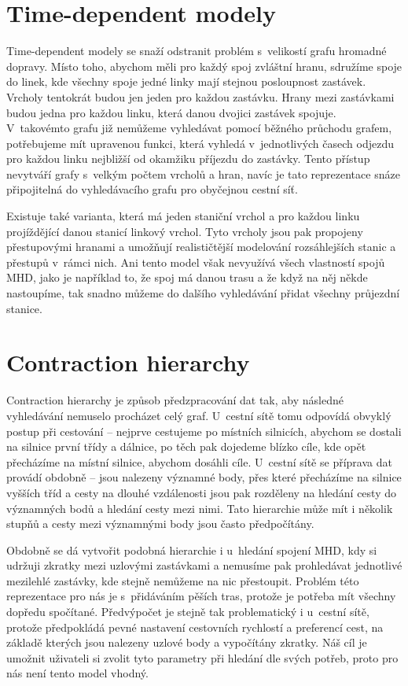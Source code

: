 \section{Time-dependent modely}
Time-dependent modely\cite{time-dependent} se snaží odstranit problém
s~velikostí grafu hromadné dopravy. Místo toho, abychom měli pro každý spoj
zvláštní hranu, sdružíme spoje do linek, kde všechny spoje jedné linky mají
stejnou posloupnost zastávek. Vrcholy tentokrát budou jen jeden pro každou
zastávku. Hrany mezi zastávkami budou jedna pro každou linku, která danou
dvojici zastávek spojuje. V~takovémto grafu již nemůžeme vyhledávat pomocí
běžného průchodu grafem, potřebujeme mít upravenou funkci, která vyhledá
v~jednotlivých časech odjezdu pro každou linku nejbližší od okamžiku příjezdu do
zastávky. Tento přístup nevytváří grafy s~velkým počtem vrcholů a hran, navíc je
tato reprezentace snáze připojitelná do vyhledávacího grafu pro obyčejnou cestní
síť.

Existuje také varianta, která má jeden staniční vrchol a
pro každou linku projíždějící danou stanicí linkový vrchol. Tyto vrcholy jsou
pak propojeny přestupovými hranami a umožňují realističtější modelování
rozsáhlejších stanic a přestupů v~rámci nich. Ani tento model však nevyužívá
všech vlastností spojů MHD, jako je například to, že spoj má danou trasu a že
když na něj někde nastoupíme, tak snadno můžeme do dalšího vyhledávání přidat všechny
průjezdní stanice.  

\section{Contraction hierarchy}
Contraction hierarchy\cite{CH} je způsob předzpracování dat tak, aby následné
vyhledávání nemuselo procházet celý graf. U~cestní sítě tomu odpovídá obvyklý
postup při cestování -- nejprve cestujeme po místních silnicích, abychom se
dostali na silnice první třídy a dálnice, po těch pak dojedeme blízko cíle, kde
opět přecházíme na místní silnice, abychom dosáhli cíle. U~cestní sítě se
příprava dat provádí obdobně -- jsou nalezeny významné body, přes které
přecházíme na silnice vyšších tříd a cesty na dlouhé vzdálenosti jsou pak
rozděleny na hledání cesty do významných bodů a hledání cesty mezi nimi. Tato
hierarchie může mít i několik stupňů a cesty mezi významnými body jsou často
předpočítány.

Obdobně se dá vytvořit podobná hierarchie i u~hledání spojení MHD, kdy si
udržuji zkratky mezi uzlovými zastávkami a nemusíme pak prohledávat jednotlivé
mezilehlé zastávky, kde stejně nemůžeme na nic přestoupit. Problém této
reprezentace pro nás je s~přidáváním pěších tras, protože je potřeba mít všechny dopředu
spočítané. Předvýpočet je stejně tak problematický i u~cestní sítě, protože
předpokládá pevné nastavení cestovních rychlostí a preferencí cest, na základě
kterých jsou nalezeny uzlové body a vypočítány zkratky. Náš cíl je umožnit
uživateli si zvolit tyto parametry při hledání dle svých potřeb, proto pro nás
není tento model vhodný. 

